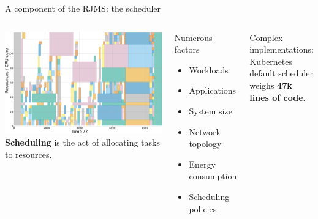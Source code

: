 \documentclass[12pt, aspectratio=43]{beamer}
\begin{document}
\begin{frame}{A component of the RJMS: the scheduler}
	\begin{columns}
		\includegraphics[width=\textwidth]{../imgs/gantt_small.png}
		\textbf{Scheduling} is the act of allocating tasks to resources.

		\begin{exampleblock}{Numerous factors}
			\begin{itemize}
				\item Workloads
				\item Applications
				\item System size
				\item Network topology
				\item Energy consumption
				\item Scheduling policies
			\end{itemize}
		\end{exampleblock}

		Complex implementations: Kubernetes default
		scheduler weighs \textbf{47k lines of code}.
	\end{columns}
\end{frame}
\end{document}
